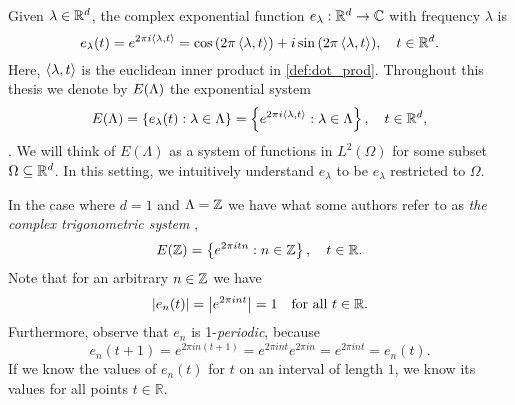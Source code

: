 \documentclass[../thesis.tex]{subfiles}
\begin{document}
Given $\lambda \in \mathbb{R}^d$, the complex exponential function $e_{\lambda}: \mathbb{R}^d \rightarrow \mathbb{C}$ with frequency $\lambda$ is 
\begin{equation*}
    e_{\lambda}(t) = e^{2 \pi i \langle \lambda, t \rangle} = \cos{\left(2 \pi \left \langle \lambda,t \right \rangle\right)} + i \sin{\left(2 \pi \left \langle \lambda,t \right \rangle\right)}, \quad t\in \mathbb{R}^d.
\end{equation*}
Here, $\left \langle \lambda, t \right \rangle$ is the euclidean inner product in \cref{def:dot_prod}. Throughout this thesis we denote by $E(\Lambda)$ the exponential system
\begin{equation*}
    E(\Lambda) = \left\{e_\lambda(t) : \lambda \in \Lambda\right\} = \left\{e^{2\pi i \left \langle \lambda,t \right \rangle} : \lambda \in \Lambda\right\}, \quad t\in \mathbb{R}^d,
\end{equation*}
. We will think of $E(\Lambda)$ as a system of functions in $L^2(\Omega)$ for some subset $\Omega \subseteq \mathbb{R}^d$. In this setting, we intuitively understand $e_\lambda$ to be $e_\lambda$ restricted to $\Omega$. %

\begin{example}
    In the case where $d=1$ and $\Lambda = \mathbb{Z}$ we have what some authors refer to as \emph{the complex trigonometric system} \cite{heilMetricsNormsInner2018} \cite{encyclopediaofmathematicsTrigonometricSystem},
    \begin{equation*}
        E(\mathbb{Z}) = \left\{e^{2\pi i t n} : n \in \mathbb{Z}\right\}, \quad t\in \mathbb{R}.
    \end{equation*}
    Note that for an arbitrary $n \in \mathbb{Z}$ we have
    \begin{equation*}
        \left|e_{n}(t) \right|= \left|e^{2 \pi i n t}\right| = 1 \quad \text{for all } t\in \mathbb{R}.
    \end{equation*}
    Furthermore, observe that $e_n$ is 1-\emph{periodic}, because
    \begin{equation*}
        e_n(t+1) = e^{2 \pi i n (t+1)} = e^{2 \pi i n t} e^{2 \pi i n} = e^{2 \pi i n t} = e_n(t).
    \end{equation*}
    If we know the values of $e_n(t)$ for $t$ on an interval of length $1$, we know its values for all points $t\in \mathbb{R}$. %
\end{example}
\end{document}
